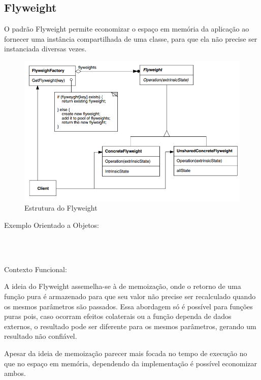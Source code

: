 \subsection{Flyweight}

O padrão Flyweight permite economizar o espaço em memória 
da aplicação ao fornecer uma instância compartilhada de 
uma classe, para que ela não precise ser instanciada 
diversas vezes.

\begin{figure}[htb]
	\caption{\label{fig_grafico}Estrutura do Flyweight}
	\begin{center}
	    \includegraphics[scale=0.5]{5_padroes-contexto-funcional/5.2_estruturais/5.2.6_flyweight/diagram.png}
	\end{center}
\end{figure}

Exemplo Orientado a Objetos:

\begin{lstlisting}[caption={Flyweight Orientado a Objetos},label=ooflyweight]



\end{lstlisting}

Contexto Funcional:

A ideia do Flyweight assemelha-se à de memoização, onde o 
retorno de uma função pura é armazenado para que seu valor 
não precise ser recalculado quando os mesmos parâmetros 
são passados. Essa abordagem só é possível para funções 
puras pois, caso ocorram efeitos colaterais ou a função 
dependa de dados externos, o resultado pode ser diferente 
para os mesmos parâmetros, gerando um resultado não 
confiável.

Apesar da ideia de memoização parecer mais focada no tempo 
de execução no que no espaço em memória, dependendo da 
implementação é possível economizar ambos.

\begin{lstlisting}[caption={Flyweight Funcional},label=fpflyweight]
    

    
\end{lstlisting}